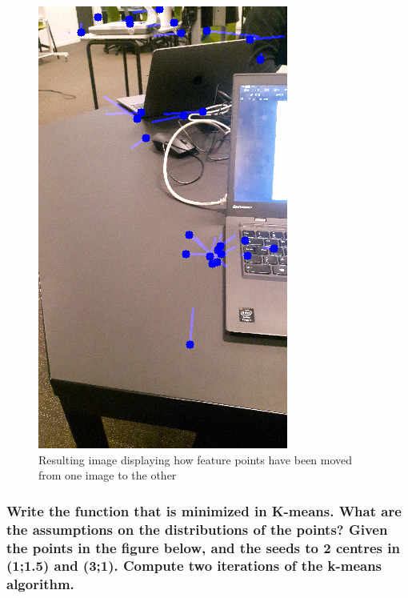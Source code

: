 \documentclass[a4paper, titlepage,12pt]{article}
\begin{document}
\begin{figure}
	\begin{center}
		\includegraphics[scale=0.6]{./flow_out.png}
		\caption{Resulting image displaying how feature points have been moved from one image to the other}
	\end{center}
\end{figure}

	\subsubsection*{Write the function that is minimized in K-means. What are
the assumptions on the distributions of the points?
Given the points in the figure below, and the seeds to 2 centres in
(1;1.5) and (3;1). Compute two iterations of the k-means algorithm.}
\end{document}
